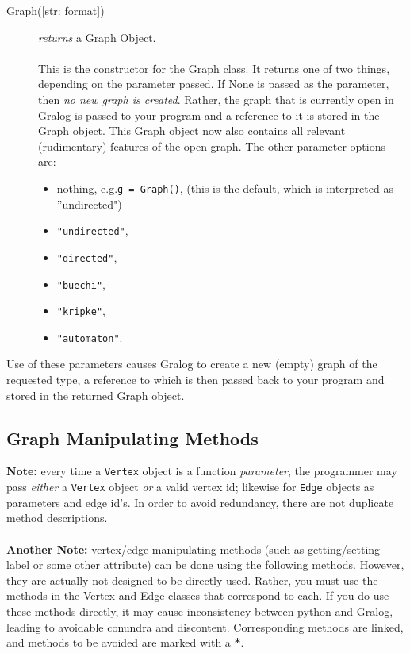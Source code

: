 \begin{description}
\item[Graph({[str: format]})] \emph{returns} a Graph Object.\\\\
This is the constructor for the Graph class. It returns one of two things, depending on the parameter passed. If None is passed as the parameter, then \textit{no new graph is created}. Rather, the graph that is currently open in Gralog is passed to your program and a reference to it is stored in the Graph object. This Graph object now also contains all relevant (rudimentary) features of the open graph. The other parameter options are:
\begin{itemize}
\item nothing, e.g.\@ \texttt{g = Graph()}, (this is the default, which is interpreted as ''undirected")
\item \texttt{"{}undirected"},
\item \texttt{"directed"},
\item \texttt{"buechi"},
\item \texttt{"kripke"},
\item \texttt{"{}automaton"}.
\end{itemize}
\end{description}

Use of these parameters causes Gralog to create a new (empty) graph of the requested type, a reference to which is then passed back to your program and stored in the returned Graph object.
\subsection{Graph Manipulating Methods}
\textbf{Note:} every time a \texttt{Vertex} object is a function \textit{parameter}, the programmer may pass \textit{either} a \texttt{Vertex} object \textit{or} a valid vertex id; likewise for \texttt{Edge} objects as parameters and edge id's. In order to avoid redundancy, there are not duplicate method descriptions.\\\\
\textbf{Another Note:} vertex/edge manipulating methods (such as getting/setting label or some other attribute) can be done using the following methods. However, they are actually not designed to be directly used. Rather, you must use the methods in the Vertex and Edge classes that correspond to each. If you do use these methods directly, it may cause inconsistency between python and Gralog, leading to avoidable conundra and discontent. Corresponding methods are linked, and methods to be avoided are marked with a \textbf{*}.

